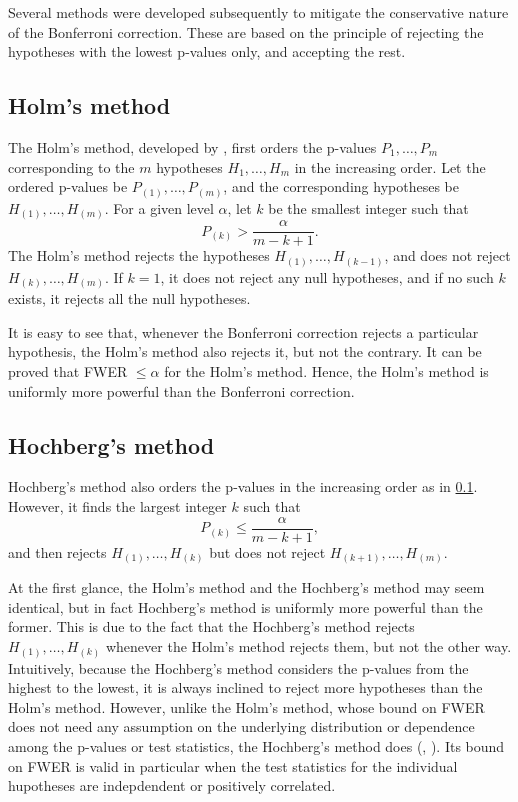 \documentclass[
]{book}
\begin{document}
Several methods were developed subsequently to mitigate the conservative nature of the Bonferroni correction. These are based on the principle of rejecting the hypotheses with the lowest p-values only, and accepting the rest.

\hypertarget{holm}{%
\subsection{Holm's method}\label{holm}}

The Holm's method, developed by \citet{holm1979simple}, first orders the p-values \(P_1, \ldots, P_m\) corresponding to the \(m\) hypotheses \(H_1, \ldots, H_m\) in the increasing order. Let the ordered p-values be \(P_{(1)}, \ldots, P_{(m)}\), and the corresponding hypotheses be \(H_{(1)}, \ldots, H_{(m)}\). For a given level \(\alpha\), let \(k\) be the smallest integer such that \[P_{(k)} > \frac{\alpha}{m - k + 1}.\] The Holm's method rejects the hypotheses \(H_{(1)}, \ldots, H_{(k-1)}\), and does not reject \(H_{(k)}, \ldots, H_{(m)}\). If \(k = 1\), it does not reject any null hypotheses, and if no such \(k\) exists, it rejects all the null hypotheses.

It is easy to see that, whenever the Bonferroni correction rejects a particular hypothesis, the Holm's method also rejects it, but not the contrary. It can be proved that FWER \(\le \alpha\) for the Holm's method. Hence, the Holm's method is uniformly more powerful than the Bonferroni correction.

\hypertarget{hochberg}{%
\subsection{Hochberg's method}\label{hochberg}}

Hochberg's method \citep{hochberg1988sharper} also orders the p-values in the increasing order as in \ref{holm}. However, it finds the largest integer \(k\) such that \[P_{(k)} \le \frac{\alpha}{m - k + 1},\] and then rejects \(H_{(1)}, \ldots, H_{(k)}\) but does not reject \(H_{(k+1)}, \ldots, H_{(m)}\).

At the first glance, the Holm's method and the Hochberg's method may seem identical, but in fact Hochberg's method is uniformly more powerful than the former. This is due to the fact that the Hochberg's method rejects \(H_{(1)}, \ldots, H_{(k)}\) whenever the Holm's method rejects them, but not the other way. Intuitively, because the Hochberg's method considers the p-values from the highest to the lowest, it is always inclined to reject more hypotheses than the Holm's method.
However, unlike the Holm's method, whose bound on FWER does not need any assumption on the underlying distribution or dependence among the p-values or test statistics, the Hochberg's method does (\citet{sarkar1997simes}, \citet{sarkar1998some}). Its bound on FWER is valid in particular when the test statistics for the individual hupotheses are indepdendent or positively correlated.
\end{document}

